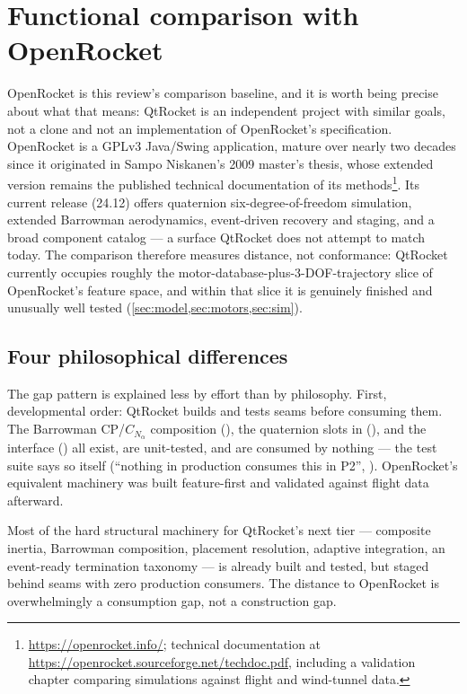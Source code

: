 \section{Functional comparison with OpenRocket}\label{sec:comparison}

OpenRocket is this review's comparison baseline, and it is worth being precise about what that
means: QtRocket is an independent project with similar goals, not a clone and not an
implementation of OpenRocket's specification. OpenRocket is a GPLv3 Java/Swing application,
mature over nearly two decades since it originated in Sampo Niskanen's 2009 master's thesis,
whose extended version remains the published technical documentation of its
methods\footnote{\url{https://openrocket.info/}; technical documentation at
\url{https://openrocket.sourceforge.net/techdoc.pdf}, including a validation chapter comparing
simulations against flight and wind-tunnel data.}. Its current release (24.12) offers quaternion
six-degree-of-freedom simulation, extended Barrowman aerodynamics, event-driven recovery and
staging, and a broad component catalog --- a surface QtRocket does not attempt to match today.
The comparison therefore measures distance, not conformance: QtRocket currently occupies roughly
the motor-database-plus-3-DOF-trajectory slice of OpenRocket's feature space, and within that
slice it is genuinely finished and unusually well tested (\cref{sec:model,sec:motors,sec:sim}).

\subsection{Four philosophical differences}\label{sec:comparison-philosophy}

The gap pattern is explained less by effort than by philosophy. First, developmental order:
QtRocket builds and tests seams before consuming them. The Barrowman CP/$C_{N_\alpha}$
composition (), the quaternion slots in 
(), and the  interface
() all exist, are unit-tested, and are consumed by nothing ---
the test suite says so itself (``nothing in production consumes this in P2'',
). OpenRocket's equivalent machinery was built feature-first
and validated against flight data afterward.

\begin{keyinsight}
Most of the hard structural machinery for QtRocket's next tier --- composite inertia, Barrowman
composition, placement resolution, adaptive integration, an event-ready termination taxonomy ---
is already built and tested, but staged behind seams with zero production consumers. The
distance to OpenRocket is overwhelmingly a consumption gap, not a construction gap.
\end{keyinsight}

